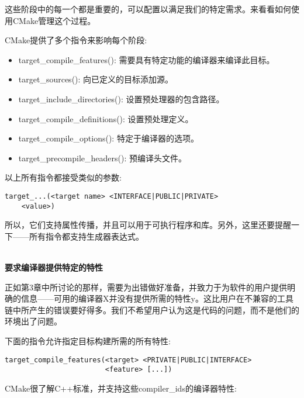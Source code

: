 这些阶段中的每一个都是重要的，可以配置以满足我们的特定需求。来看看如何使用CMake管理这个过程。


CMake提供了多个指令来影响每个阶段:

\begin{itemize}
\item 
target\_compile\_features(): 需要具有特定功能的编译器来编译此目标。

\item 
target\_sources(): 向已定义的目标添加源。

\item 
target\_include\_directories(): 设置预处理器的包含路径。

\item 
target\_compile\_definitions(): 设置预处理定义。

\item 
target\_compile\_options(): 特定于编译器的选项。

\item 
target\_precompile\_headers(): 预编译头文件。
\end{itemize}

以上所有指令都接受类似的参数:

\begin{lstlisting}[style=styleCMake]
target_...(<target name> <INTERFACE|PUBLIC|PRIVATE>
	<value>)
\end{lstlisting}

所以，它们支持属性传播，并且可以用于可执行程序和库。另外，这里还要提醒一下——所有指令都支持生成器表达式。

\hspace*{\fill} \\ %
\noindent
\textbf{要求编译器提供特定的特性}

正如第3章中所讨论的那样，需要为出错做好准备，并致力于为软件的用户提供明确的信息——可用的编译器X并没有提供所需的特性y。这比用户在不兼容的工具链中所产生的错误要好得多。我们不希望用户认为这是代码的问题，而不是他们的环境出了问题。

下面的指令允许指定目标构建所需的所有特性:

\begin{lstlisting}[style=styleCMake]
target_compile_features(<target> <PRIVATE|PUBLIC|INTERFACE>
						<feature> [...])
\end{lstlisting}

CMake很了解C++标准，并支持这些compiler\_ids的编译器特性:

